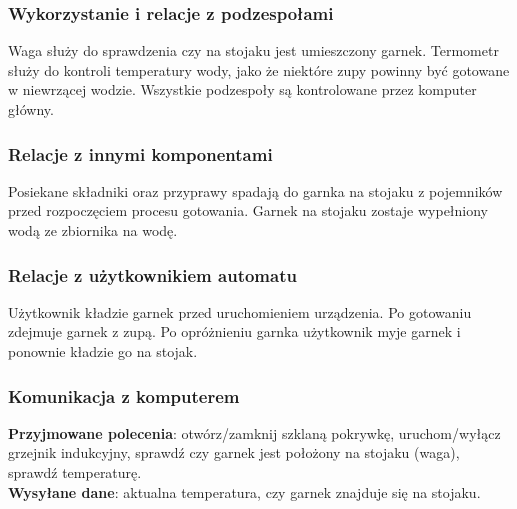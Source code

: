 \documentclass[12pt,a4paper,notitlepage]{article}
\begin{document}
\subsubsection{Wykorzystanie i relacje z podzespołami}
Waga służy do sprawdzenia czy na stojaku jest umieszczony garnek. Termometr służy do kontroli temperatury wody, jako że niektóre zupy powinny być gotowane w niewrzącej wodzie. Wszystkie podzespoły są kontrolowane przez komputer główny.

\subsubsection{Relacje z innymi komponentami}
Posiekane składniki oraz przyprawy spadają do garnka na stojaku z pojemników przed rozpoczęciem procesu gotowania. Garnek na stojaku zostaje wypełniony wodą ze zbiornika na wodę.

\subsubsection{Relacje z użytkownikiem automatu}
Użytkownik kładzie garnek przed uruchomieniem urządzenia. Po gotowaniu zdejmuje garnek z zupą. Po opróżnieniu garnka użytkownik myje garnek i ponownie kładzie go na stojak.

\subsubsection{Komunikacja z komputerem}
\textbf{Przyjmowane polecenia}: otwórz/zamknij szklaną pokrywkę, uruchom/wyłącz grzejnik indukcyjny, sprawdź czy garnek jest położony na stojaku (waga), sprawdź temperaturę.\\
\textbf{Wysyłane dane}: aktualna temperatura, czy garnek znajduje się na stojaku.
\end{document}
